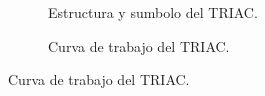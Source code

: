         \begin{figure}[H]
            \centering
            \begin{subfigure}[ht]{0.48\textwidth}
              \caption{Estructura y sumbolo del TRIAC.}
              \label{fig:EstrucTriac}
            \end{subfigure}
            \hfill 
            \begin{subfigure}[ht]{0.48\textwidth}
              \caption{Curva de trabajo del TRIAC.}
              \label{fig:CurvaTriac}
            \end{subfigure}
        \end{figure}

